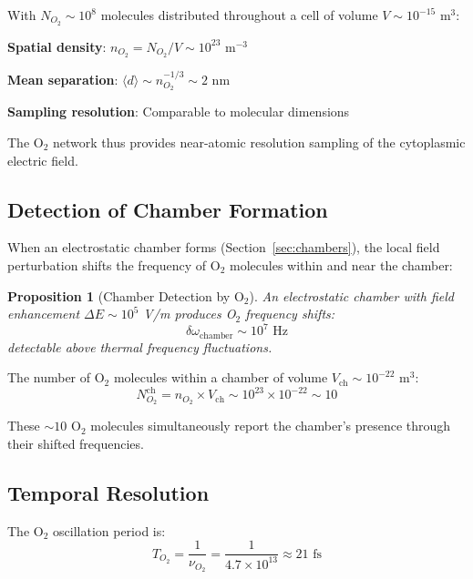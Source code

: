 \documentclass[twocolumn,10pt,aps,prd,superscriptaddress,floatfix,nofootinbib]{revtex4-2}
\newtheorem{proposition}[theorem]{Proposition}
\theoremstyle{remark}
\begin{document}
With $N_{O_2} \sim 10^8$ molecules distributed throughout a cell of volume $V \sim 10^{-15}$ m$^3$:

\textbf{Spatial density}: $n_{O_2} = N_{O_2}/V \sim 10^{23}$ m$^{-3}$

\textbf{Mean separation}: $\langle d \rangle \sim n_{O_2}^{-1/3} \sim 2$ nm

\textbf{Sampling resolution}: Comparable to molecular dimensions

The O$_2$ network thus provides near-atomic resolution sampling of the cytoplasmic electric field.

\subsection{Detection of Chamber Formation}

When an electrostatic chamber forms (Section~\ref{sec:chambers}), the local field perturbation shifts the frequency of O$_2$ molecules within and near the chamber:

\begin{proposition}[Chamber Detection by O$_2$]
\label{prop:chamber_detection}
An electrostatic chamber with field enhancement $\Delta E \sim 10^5$ V/m produces O$_2$ frequency shifts:
\begin{equation}
\delta\omega_{\mathrm{chamber}} \sim 10^7 \text{ Hz}
\end{equation}
detectable above thermal frequency fluctuations.
\end{proposition}

The number of O$_2$ molecules within a chamber of volume $V_{\mathrm{ch}} \sim 10^{-22}$ m$^3$:
\begin{equation}
N_{O_2}^{\mathrm{ch}} = n_{O_2} \times V_{\mathrm{ch}} \sim 10^{23} \times 10^{-22} \sim 10
\end{equation}

These $\sim 10$ O$_2$ molecules simultaneously report the chamber's presence through their shifted frequencies.

\subsection{Temporal Resolution}

The O$_2$ oscillation period is:
\begin{equation}
T_{O_2} = \frac{1}{\nu_{O_2}} = \frac{1}{4.7 \times 10^{13}} \approx 21 \text{ fs}
\end{equation}
\end{document}
